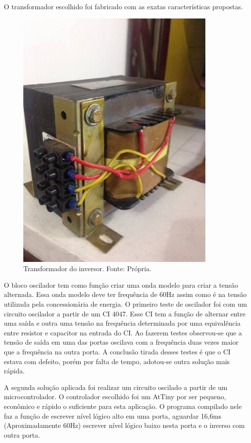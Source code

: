 				O transformador escolhido foi fabricado com as exatas características 							propostas.		

                \begin{figure}[!htb]
            		\centering
            		\includegraphics[scale= 0.3]{figuras/Transformador_Inversor.jpg}
            		\caption{Transformador do inversor. Fonte: Própria.}
            		\label{transformador-inversor}
            	\end{figure} 	
            	
            	O bloco oscilador tem como função criar uma onda modelo para criar a tensão 					alternada. Essa onda modelo deve ter frequência de 60Hz assim como é na tensão 				utilizada pela concessionária de energia. O primeiro teste de oscilador foi 					com um circuito oscilador a partir de um CI 4047. Esse CI tem a função de 						alternar entre uma saída e outra uma tensão na frequência determinada por uma 					equivalência entre resistor e capacitor na entrada do CI. Ao fazerem testes 					observou-se que a tensão de saída em uma das portas oscilava com a frequência 					duas vezes maior que a frequência na outra porta. A conclusão tirada desses 					testes é que o CI estava com defeito, porém por falta de tempo, adotou-se 						outra solução mais rápida.
            	
				A segunda solução aplicada foi realizar um circuito oscilado a partir de um 					microcontrolador. O controlador escolhido foi um AtTiny por ser pequeno, 						econômico e rápido o suficiente para esta aplicação. O programa compilado nele 				faz a função de escrever nível lógico alto em uma porta, aguardar 16,6ms 						(Aproximadamente 60Hz) escrever nível lógico baixo nesta porta e o inverso com 				outra porta. 	

